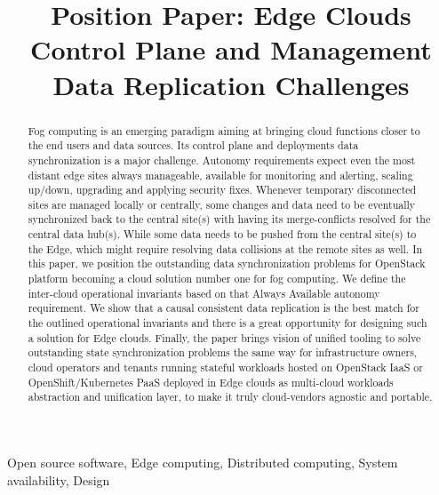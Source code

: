 \documentclass[conference]{IEEEtran}
\begin{document}
\title{Position Paper: Edge Clouds Control Plane and Management Data
Replication Challenges\\
}

\author{
}

\maketitle

\begin{abstract}
Fog computing is an emerging paradigm aiming at bringing cloud functions closer to the end users and data sources. Its control
plane and deployments data synchronization is a major challenge. Autonomy
requirements expect even the most distant edge sites always manageable,
available for monitoring and alerting, scaling up/down, upgrading and
applying security fixes. Whenever temporary disconnected sites are managed
locally or centrally, some changes and data need to be eventually
synchronized back to the central site(s) with having its merge-conflicts
resolved for the central data hub(s). While some data needs to be pushed from
the central site(s) to the Edge, which might require resolving data
collisions at the remote sites as well. In this paper, we position the
outstanding data synchronization problems for OpenStack platform becoming a
cloud solution number one for fog computing. We define the inter-cloud
operational invariants based on that Always Available autonomy requirement.
We show that a causal consistent data replication is the best match for the
outlined operational invariants and there is a great opportunity for
designing such a solution for Edge clouds. Finally, the paper brings vision
of unified tooling to solve outstanding state synchronization problems the
same way for infrastructure owners, cloud operators and tenants running
stateful workloads hosted on OpenStack IaaS or OpenShift/Kubernetes PaaS
deployed in Edge clouds as multi-cloud workloads abstraction and unification
layer, to make it truly cloud-vendors agnostic and portable.
\end{abstract}

\begin{IEEEkeywords}
Open source software, Edge computing, Distributed computing, System
availability, Design
\end{IEEEkeywords}
\end{document}
